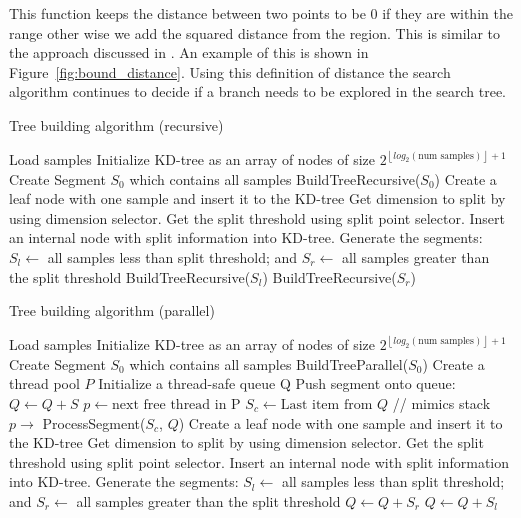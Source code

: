 \documentclass[11pt]{amsart}
\begin{document}
This function keeps the distance between two points to be 0 if they are within the range other wise we add the squared distance from the region. This is similar to the approach discussed in \cite{bounding_distance}.  An example of this is shown in Figure~\ref{fig:bound_distance}. Using this definition of distance the search algorithm continues to decide if a branch needs to be explored in the search tree.



\begin{algorithm}
\caption{Tree building algorithm (recursive)}
\label{tree_building_recursive}
\begin{algorithmic}[1]
\State Load samples
\State Initialize KD-tree as an array of nodes of size $2^{\left \lfloor{log_{2}(\text{num samples})}\right \rfloor + 1 }$ 
\State Create Segment $S_0$ which contains all samples
\State 
\State BuildTreeRecursive($S_0$)
\State 
{}
\State Create a leaf node with one sample and insert it to the KD-tree
\Else
\State Get dimension to split by using dimension selector.
\State Get the split threshold using split point selector.
\State Insert an internal node with split information into KD-tree.
\State
\State Generate the segments:
\State $S_l \gets $ all samples less than split threshold; and
\State $S_r \gets $  all samples greater than the split threshold
\State
\State BuildTreeRecursive($S_l$)
\State BuildTreeRecursive($S_r$)
\EndIf
\EndProcedure
\end{algorithmic}
\end{algorithm}

\begin{algorithm}
\caption{Tree building algorithm (parallel)}
\label{tree_building_parallel}
\begin{algorithmic}[1]
\State Load samples
\State Initialize KD-tree as an array of nodes of size $2^{\left \lfloor{log_{2}(\text{num samples})}\right \rfloor + 1 }$ 
\State Create Segment $S_0$ which contains all samples
\State 
\State BuildTreeParallel($S_0$)
\State
{}
\State Create a thread pool $P$
\State Initialize a thread-safe queue Q
\State Push segment onto queue: $Q \gets Q + S$
\State $p \gets \text{next free thread in P}$
\State $S_c \gets \text{Last item from } Q$ \hspace{0.5in}// mimics stack
\State $p \rightarrow$  ProcessSegment($S_c$, $Q$)
\EndWhile
\EndProcedure
\State
{}
\State Create a leaf node with one sample and insert it to the KD-tree
\Else
\State Get dimension to split by using dimension selector.
\State Get the split threshold using split point selector.
\State Insert an internal node with split information into KD-tree.
\State
\State Generate the segments:
\State $S_l \gets $ all samples less than split threshold; and
\State $S_r \gets $  all samples greater than the split threshold
\State
\State $Q \gets Q + S_r$
\State $Q \gets Q + S_l$
\EndIf
\EndProcedure
\State 
\end{algorithmic}
\end{algorithm}
\end{document}
